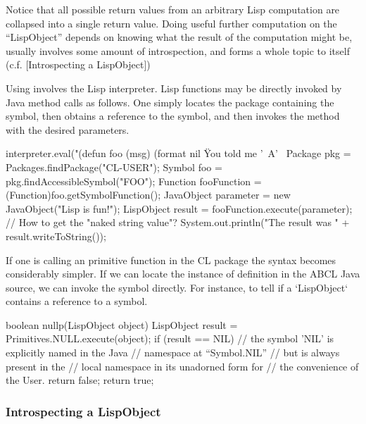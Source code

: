 \documentclass[10pt]{book}
\begin{document}
Notice that all possible return values from an arbitrary Lisp
computation are collapsed into a single return value.  Doing useful
further computation on the ``LispObject'' depends on knowing what the
result of the computation might be, usually involves some amount
of  introspection, and forms a whole topic to itself
(c.f. [Introspecting a LispObject])

Using  involves the Lisp interpreter.  Lisp functions may
be directly invoked by Java method calls as follows.  One simply
locates the package containing the symbol, then obtains a reference to
the symbol, and then invokes the  method with the
desired parameters.

\begin{listing-java}
    interpreter.eval("(defun foo (msg) (format nil \"You told me '~A'~%
    Package pkg = Packages.findPackage("CL-USER");
    Symbol foo = pkg.findAccessibleSymbol("FOO"); 
    Function fooFunction = (Function)foo.getSymbolFunction();
    JavaObject parameter = new JavaObject("Lisp is fun!");
    LispObject result = fooFunction.execute(parameter);
    // How to get the "naked string value"?
    System.out.println("The result was " + result.writeToString()); 
\end{listing-java}

If one is calling an primitive function in the CL package the syntax
becomes considerably simpler.  If we can locate the instance of
definition in the ABCL Java source, we can invoke the symbol directly.
For instance, to tell if a `LispObject` contains a reference to a symbol.

\begin{listing-java}
    boolean nullp(LispObject object) {
      LispObject result = Primitives.NULL.execute(object);
      if (result == NIL) { // the symbol 'NIL' is explicitly named in the Java
                           // namespace at ``Symbol.NIL''
                           // but is always present in the
                           // local namespace in its unadorned form for
                           // the convenience of the User.
        return false;
      }
      return true;
   }
\end{listing-java}

\subsubsection{Introspecting a LispObject}
\label{topic:Introspecting a LispObject}
\end{document}
